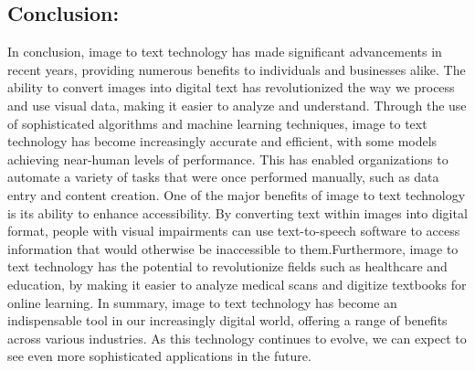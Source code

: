 \subsection{Conclusion:}
 In conclusion, image to text technology has made significant advancements in recent years, providing numerous benefits to individuals and businesses alike. The ability to convert images into digital text has revolutionized the way we process and use visual data, making it easier to analyze and understand. Through the use of sophisticated algorithms and machine learning techniques, image to text technology has become increasingly accurate and efficient, with some models achieving near-human levels of performance. This has enabled organizations to automate a variety of tasks that were once performed manually, such as data entry and content creation. One of the major benefits of image to text technology is its ability to enhance accessibility. By converting text within images into digital format, people with visual impairments can use text-to-speech software to access information that would otherwise be inaccessible to them.Furthermore, image to text technology has the potential to revolutionize fields such as healthcare and education, by making it easier to analyze medical scans and digitize textbooks for online learning. In summary, image to text technology has become an indispensable tool in our increasingly digital world, offering a range of benefits across various industries. As this technology continues to evolve, we can expect to see even more sophisticated applications in the future.